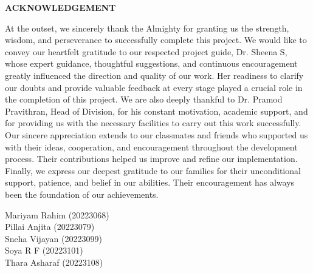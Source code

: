 \clearpage
{}
{}
\thispagestyle{plain}

\begin{center}
{\Large \textbf{ACKNOWLEDGEMENT}}
\end{center}

\justifying
\noindent
At the outset, we sincerely thank the Almighty for granting us the strength, wisdom, and perseverance to successfully complete this project.
We would like to convey our heartfelt gratitude to our respected project guide, Dr. Sheena S, whose expert guidance, thoughtful suggestions, and continuous encouragement greatly influenced the direction and quality of our work. Her readiness to clarify our doubts and provide valuable feedback at every stage played a crucial role in the completion of this project.
We are also deeply thankful to Dr. Pramod Pravithran, Head of Division, for his constant motivation, academic support, and for providing us with the necessary facilities to carry out this work successfully.
Our sincere appreciation extends to our classmates and friends who supported us with their ideas, cooperation, and encouragement throughout the development process. Their contributions helped us improve and refine our implementation.
Finally, we express our deepest gratitude to our families for their unconditional support, patience, and belief in our abilities. Their encouragement has always been the foundation of our achievements.

\vspace{1.5cm}
\noindent
Mariyam Rahim (20223068)\\
Pillai Anjita (20223079)\\
Sneha Vijayan (20223099)\\
Soya R F (20223101)\\
Thara Asharaf (20223108)

\vfill
\clearpage